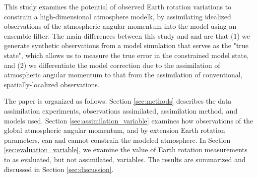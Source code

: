This study examines the potential of observed Earth rotation variations to constrain a high-dimensional atmosphere modelk, by assimilating idealized observations of the atmospheric angular momentum into the model using an ensemble filter. 
The main differences between this study and \citet{Saynisch2010,Saynisch2011} and \citet{Saynisch2012} are that (1) we generate synthetic observations from a model simulation that serves as the "true state", which allows us to measure the true error in the constrained model state, and (2) we differentiate the model correction due to the assimilation of atmospheric angular momentum to that from the assimilation of conventional, spatially-localized observations. 


The paper is organized as follows.  
Section \ref{sec:methods} describes the data assimilation experiments, observations assimilated, assimilation method, and models used.
Section \ref{sec:assimilation_variable} examines how observations of the global atmospheric angular momentum, and by extension Earth rotation parameters, can and cannot constrain the modeled atmosphere. 
In Section \ref{sec:evaluation_variable}, we examine the value of Earth rotation measurements to as evaluated, but not assimilated, variables.  
The results are summarized and discussed in Section \ref{sec:discussion}.

